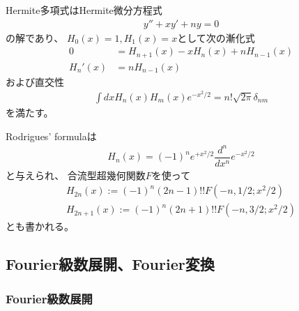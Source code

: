 Hermite多項式はHermite微分方程式
\begin{align}
    y'' + x y' + n y = 0
\end{align}
の解であり、
$H_0(x) = 1, H_1(x) = x$として次の漸化式
\begin{subequations}
\begin{align}
    0
    &=
    H_{n+1}(x)
    -
    x H_n(x)
    +
    n H_{n-1}(x)
\\
    H_n'(x)
    &=
    n H_{n-1}(x)
\end{align}
\label{hermite polynomial recurrence relation}
\end{subequations}
および直交性
\begin{align}
    \int dx H_n(x) H_m(x) e^{-x^2/2}
    =
    n! \sqrt{2 \pi}
    \delta_{nm}
\label{normality of hermite polynomial}
\end{align}
を満たす。

Rodrigues' formulaは
\begin{align}
    H_n(x)
    =
    (-1)^n e^{ + x^2 / 2 }
    \dfrac{d^n}{dx^n}
    e^{ - x^2 / 2 }
\label{hermite rodrigues formula}
\end{align}
と与えられ、
合流型超幾何関数$F$を使って
\begin{subequations}
\begin{align}
    H_{2n}(x)
    :=
        (-1)^n
        (2 n - 1)!!
    F(-n, 1/2; x^2/2)
\\
    H_{2n+1}(x)
    :=
        (-1)^n
        (2 n + 1)!!
    F(-n, 3/2; x^2/2)
\end{align}
\end{subequations}
とも書かれる。

\newpage
\subsection{Fourier級数展開、Fourier変換}

\subsubsection{Fourier級数展開}

